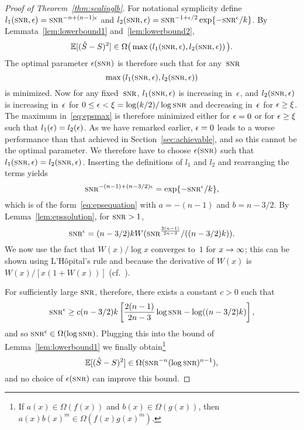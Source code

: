 %
\begin{proof}[Proof of Theorem~\ref{thm:scalinglb}]
  For notational symplicity define $l_1(\snr, \e) = \snr^{-n+(n-1)\e}$ and $l_2(\snr,\e) = \snr^{-1+\e/2}
  \exp\{-\snr^\e/k\}$. By Lemmata~\ref{lem:lowerbound1}
  and~\ref{lem:lowerbound2},
  \begin{equation*}
    \mse \in \Omega\big(\max \left( l_1(\snr,\e), l_2(\snr,\e) \right) \big).
  \end{equation*}
  The optimal parameter $\e(\snr)$ is therefore such that for
  any~$\snr$
  \begin{equation}
    \label{eq:epsmax}
    \max\left( l_1(\snr,\e), l_2(\snr,\e) \right)
  \end{equation}
  is minimized. Now for any fixed~$\snr$, $l_1(\snr,\e)$ is increasing in~$\epsilon$,
  and $l_2(\snr,\e)$ is increasing in~$\epsilon$ for $0 \le \e < \xi =
  \log(k/2)/\log\snr$ and decreasing in~$\epsilon$ for $\epsilon \ge \xi$.
  The maximum
  in~\eqref{eq:epsmax} is therefore minimized either for $\epsilon = 0$ or for $\epsilon \ge
  \xi$
  such that $l_1(\epsilon) = l_2(\epsilon)$. As we have remarked earlier, $\epsilon = 0$ leads to
  a worse performance than that achieved in Section~\ref{sec:achievable}, and so
  this cannot be the optimal parameter. We therefore have to choose
  $\e(\snr)$ such that $l_1(\snr,\e) = l_2(\snr, \e)$.  Inserting the
  definitions of $l_1$ and $l_2$ and rearranging the terms yields
  \begin{equation*}
    \snr^{-(n-1) + (n-3/2)\e} = \exp\{-\snr^\e/k\},
  \end{equation*}
  which is of the form~\eqref{eq:epsequation} with $a = -(n-1)$ and $b = n-3/2$.
  By Lemma~\ref{lem:epssolution}, for $\snr > 1$,
  \begin{equation*}
    \snr^\e = (n-3/2)k W(\snr^{\frac{2(n-1)}{2n-3}} / ((n-3/2)k)).
  \end{equation*}
  We now use the fact that $W(x)/\log x$ converges to~$1$ for $x \rightarrow \infty$;
  this can be shown using L'H\^opital's rule and because the derivative of
  $W(x)$ is $W(x)/[x(1 + W(x))]$ (cf.~\cite{CorlessGHJK1996}).

  For sufficiently large $\snr$, therefore, there exists a constant $c > 0$ such
  that
  \begin{equation*}
    \snr^\e \ge c(n-3/2)k \left[ \frac{2(n-1)}{2n-3}\log\snr - \log((n-3/2)k)
    \right],
  \end{equation*}
  and so $\snr^\e \in \Omega(\log\snr)$. Plugging this into the bound of
  Lemma~\ref{lem:lowerbound1} we finally obtain\footnote{If $a(x) \in
  \Omega(f(x))$ and $b(x) \in \Omega(g(x))$, then $a(x)b(x)^m \in
  \Omega(f(x)g(x)^m)$.}
  \begin{equation*}
    \mse \in \Omega(\snr^{-n}(\log\snr)^{n-1}),
  \end{equation*}
  and no choice of $\e(\snr)$ can improve this bound.
\end{proof}


